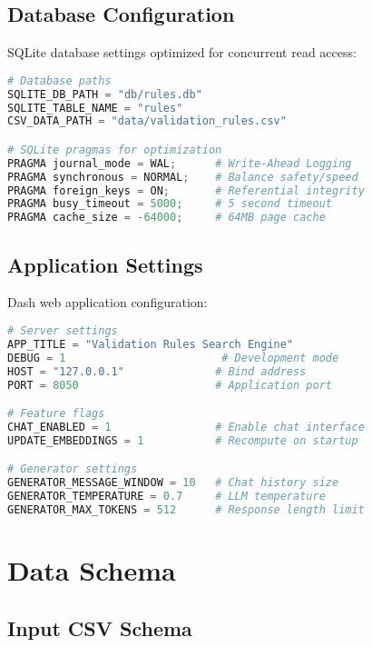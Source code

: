 \subsection{Database Configuration}

SQLite database settings optimized for concurrent read access:

\begin{lstlisting}[language=Python, caption={SQLite database configuration}, label={lst:db-config}]
# Database paths
SQLITE_DB_PATH = "db/rules.db"
SQLITE_TABLE_NAME = "rules"
CSV_DATA_PATH = "data/validation_rules.csv"

# SQLite pragmas for optimization
PRAGMA journal_mode = WAL;      # Write-Ahead Logging
PRAGMA synchronous = NORMAL;    # Balance safety/speed
PRAGMA foreign_keys = ON;       # Referential integrity
PRAGMA busy_timeout = 5000;     # 5 second timeout
PRAGMA cache_size = -64000;     # 64MB page cache
\end{lstlisting}

\subsection{Application Settings}

Dash web application configuration:

\begin{lstlisting}[language=Python, caption={Application configuration}, label={lst:app-settings}]
# Server settings
APP_TITLE = "Validation Rules Search Engine"
DEBUG = 1                        # Development mode
HOST = "127.0.0.1"              # Bind address
PORT = 8050                     # Application port

# Feature flags
CHAT_ENABLED = 1                # Enable chat interface
UPDATE_EMBEDDINGS = 1           # Recompute on startup

# Generator settings
GENERATOR_MESSAGE_WINDOW = 10   # Chat history size
GENERATOR_TEMPERATURE = 0.7     # LLM temperature
GENERATOR_MAX_TOKENS = 512      # Response length limit
\end{lstlisting}

\clearpage
\section{Data Schema}
\label{sec:app-schema}

\subsection{Input CSV Schema}

